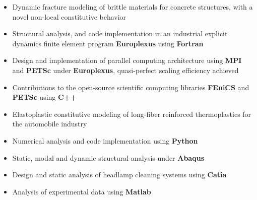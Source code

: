 \documentclass[10pt,a4paper]{altacv}
\begin{document}
\begin{itemize}
\item Dynamic fracture modeling of brittle materials for concrete structures, with a novel non-local constitutive behavior
\item Structural analysis, and code implementation in an industrial explicit dynamics finite element program \textbf{Europlexus} using \textbf{Fortran}
\item Design and implementation of parallel computing architecture using \textbf{MPI} and \textbf{PETSc} under \textbf{Europlexus}, quasi-perfect scaling efficiency achieved
\item Contributions to the open-source scientific computing libraries \textbf{FEniCS} and \textbf{PETSc} using \textbf{C++}
\end{itemize}

\divider

\begin{itemize}
\item Elastoplastic constitutive modeling of long-fiber reinforced thermoplastics for the automobile industry
\item Numerical analysis and code implementation using \textbf{Python}
\item Static, modal and dynamic structural analysis under \textbf{Abaqus}
\end{itemize}

\divider

\begin{itemize}
\item Design and static analysis of headlamp cleaning systems using \textbf{Catia}
\item Analysis of experimental data using \textbf{Matlab}
\end{itemize}
\end{document}
